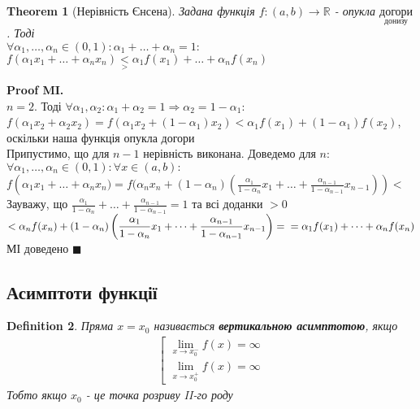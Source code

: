 \documentclass[a4paper, 14pt]{extarticle}
\def\huge{\displaystyle}
\theoremstyle{theoremdd}
\newtheorem{theorem}{Theorem}[subsection]
\theoremstyle{theoremdd}
\newtheorem{definition}[theorem]{Definition}
\theoremstyle{theoremdd}
\theoremstyle{theoremdd}
\theoremstyle{theoremdd}
\theoremstyle{theoremdd}
\theoremstyle{theoremdd}
\theoremstyle{theoremdd}
\newenvironment{pfMI}{\vspace*{-3mm} \textbf{Proof MI. \\}}{$\blacksquare$}
\begin{document}
\begin{theorem}[Нерівність Єнсена]
Задана функція $f:(a,b) \to \mathbb{R}$ - опукла $\underset{\textrm{донизу}}{\textrm{догори}}$. Тоді\\
$\forall \alpha_1, \dots, \alpha_n \in (0,1): \huge \alpha_1 + \dots + \alpha_n = 1:$\\
$\huge f(\alpha_1 x_1 + \dots + \alpha_n x_n) \underset{>}{<} \alpha_1 f(x_1) + \dots + \alpha_n f(x_n)$
\end{theorem}
\begin{pfMI}
$n = 2$. Тоді $\forall \alpha_1, \alpha_2: \alpha_1 + \alpha_2 = 1 \Rightarrow \alpha_2 = 1- \alpha_1:$\\
$f(\alpha_1 x_2 + \alpha_2 x_2) = f(\alpha_1 x_2 + (1-\alpha_1)x_2) < \alpha_1 f(x_1) + (1-\alpha_1)f(x_2)$, оскільки наша функція опукла догори\\
Припустимо, що для $n-1$ нерівність виконана. Доведемо для $n$:\\
$\forall \alpha_1,\dots,\alpha_n \in (0,1): \forall x \in (a,b):$\\
$f\left(\alpha_1 x_1 + \dots + \alpha_n x_n) = \huge f(\alpha_n x_n + (1-\alpha_n)\left(\frac{\alpha_1}{1-\alpha_n}x_1 + \dots + \frac{\alpha_{n-1}}{1-\alpha_{n-1}}x_{n-1} \right)\right) <$\\
Зауважу, що $\huge \frac{\alpha_1}{1-\alpha_n} + \dots + \frac{\alpha_{n-1}}{1-\alpha_{n-1}} = 1$ та всі доданки $>0$\\
$< \huge \alpha_n f(x_n) + (1-\alpha_n)\left(\frac{\alpha_1}{1-\alpha_n}x_1 + \dots + \frac{\alpha_{n-1}}{1-\alpha_{n-1}}x_{n-1} \right) = \\ = \alpha_1 f(x_1) + \dots + \alpha_n f(x_n)$\\
МІ доведено
\end{pfMI}

\subsection{Асимптоти функції}
\begin{definition}
Пряма $x = x_0$ називається \textbf{вертикальною асимптотою}, якщо
\begin{align*}
\left[ \begin{gathered} \lim_{x \to x_0^-} f(x) = \infty \\ \lim_{x \to x_0^+} f(x) = \infty \end{gathered} \right.
\end{align*}
Тобто якщо $x_0$ - це точка розриву II-го роду
\end{definition}
\end{document}
